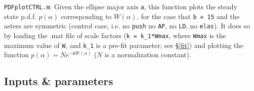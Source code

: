 \documentclass{article}
\begin{document}
\noindent\texttt{PDFplotCTRL.m}: Given the ellipse major axis \texttt{a}, this function plots the steady state p.d.f. $p(\alpha)$ corresponding to $W(\alpha)$, for the case that \texttt{b = 15} and the asters are symmetric (control case, i.e. no \texttt{push} no \texttt{AP}, no \texttt{LD}, no \texttt{elas}). It does so by loading the .mat file of scale factors (\texttt{k = k\_1*Wmax}, where \texttt{Wmax} is the maximum value of \texttt{W}, and \texttt{k\_1} is a pre-fit parameter; see \S\ref{fit}) and plotting the function $p(\alpha) = Ne^{-\texttt{k}W(\alpha)}$ ($N$ is a normalization constant).

\subsection{Inputs \& parameters}
\label{params}
\end{document}

